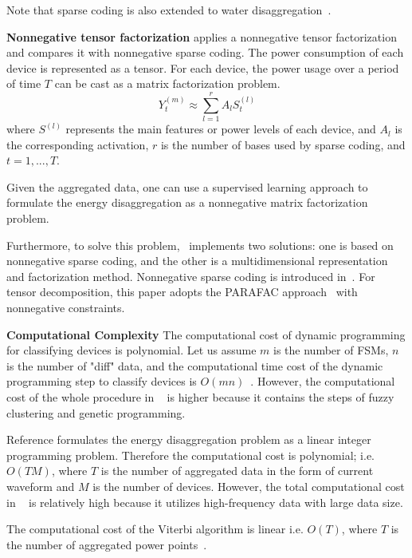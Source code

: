 Note that sparse coding is also extended to water disaggregation~\cite{Dong2013deep}.

\textbf{Nonnegative tensor factorization}
\cite{figueiredo2014electrical} applies a nonnegative tensor factorization and compares it with 
nonnegative sparse coding. 
The power consumption of each device is represented as a tensor. 
For each device, the power usage over a period of time $T$ can be cast as 
a matrix factorization problem. 
\begin{equation}
Y_t^{(m)} \approx \sum_{l=1}^r A_l S_t^{(l)}
\end{equation}
where $S^{(l)}$ represents the main features or power levels of each device, and $A_l$ is the corresponding activation, 
$r$ is the number of bases used by sparse coding, and $t=1,...,T$.

Given the aggregated data, one can use a supervised learning approach to formulate the energy disaggregation as a nonnegative matrix factorization problem. 

Furthermore, to solve this problem,~\cite{figueiredo2014electrical} implements two solutions: one is based on nonnegative 
sparse coding, and the other is a multidimensional representation and factorization method. 
Nonnegative sparse coding is introduced in~\cite{kolter2010sparse}. 
For tensor decomposition, this paper adopts the PARAFAC approach~\cite{kolda2009tensor} with nonnegative constraints. 

\textbf{Computational Complexity}
The computational cost of dynamic programming for classifying devices 
is polynomial.
Let us assume $m$ is the number of FSMs, 
$n$ is the number of "diff" data, 
and the computational time cost of the dynamic programming step to 
classify devices is $O(mn)$~\cite{chow1989complexity}. 
However, the computational cost of the whole procedure in  
~\cite{baranski2004detecting} is higher because 
it contains the steps 
of fuzzy clustering and genetic programming. 

Reference \cite{suzuki2008nonintrusive} formulates the energy disaggregation 
problem as a linear integer programming problem. 
Therefore the computational cost is polynomial; i.e. $O(TM)$, %
where $T$ is the number of aggregated data in the form of 
current waveform and 
$M$ is the number of devices. 
However, the total computational cost in  
~\cite{suzuki2008nonintrusive} is relatively high 
because it utilizes high-frequency data with large data size. 

The computational cost of the Viterbi algorithm is 
linear i.e. $O(T)$, 
where $T$ is the number of aggregated power points~\cite{bishop2006pattern}.

